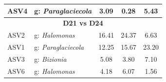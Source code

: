 \begin{table}[H]
\begin{tabular}{@{}llccc@{}}
ASV4   & g: \textit{Paraglaciecola} & 3.09  & 0.28  & 5.43 \\
\midrule
\multicolumn{5}{c}{\textbf{D21 vs D24}} \\
\midrule
ASV2   & g: \textit{Halomonas}      & 16.41 & 24.37 & 6.63 \\
ASV1   & g: \textit{Paraglaciecola} & 12.25 & 15.67 & 23.20 \\
ASV3   & g: \textit{Bizionia}       & 5.08  & 3.80  & 7.10 \\
ASV6   & g: \textit{Halomonas}      & 4.18  & 6.07  & 1.56 \\
\bottomrule
\end{tabular}
\end{table}

\begin{table}[H]
\centering
\caption{\textbf{Summary of the ASVs contributing most to the dissimilarity between probiotic-treated (Cop\_pro) copepod-associated microbial communities across pairwise stage comparisons (D16 vs D21, D16 vs D24, and D21 vs D24), based on SIMPER analysis.} Only ASVs with individual contributions $\geq 3\%$ are shown. Taxonomy is given at the lowest taxonomic level retained after applying a confidence threshold of 0.8, where g denotes genus, f family, and c class. Values represent mean relative abundance (\%) at each sampling day.}
\label{tab:simper_stages_cop_pro_ge3}

\footnotesize


\end{table}
